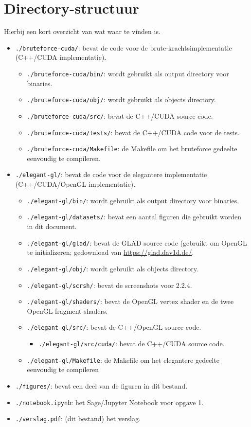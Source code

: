 \documentclass{article}
\begin{document}
\section{Directory-structuur}
Hierbij een kort overzicht van wat waar te vinden is.
\begin{itemize}
 \item \verb|./bruteforce-cuda/|: bevat de code voor de brute-krachtsimplementatie (C++/CUDA implementatie).
 \begin{itemize}
  \item \verb|./bruteforce-cuda/bin/|: wordt gebruikt als output directory voor binaries.
  \item \verb|./bruteforce-cuda/obj/|: wordt gebruikt als objects directory.
  \item \verb|./bruteforce-cuda/src/|: bevat de C++/CUDA source code.
  \item \verb|./bruteforce-cuda/tests/|: bevat de C++/CUDA code voor de tests.
  \item \verb|./bruteforce-cuda/Makefile|: de Makefile om het bruteforce gedeelte eenvoudig te compileren.
 \end{itemize}
 \item \verb|./elegant-gl/|: bevat de code voor de elegantere implementatie (C++/CUDA/OpenGL implementatie).
 \begin{itemize}
  \item \verb|./elegant-gl/bin/|: wordt gebruikt als output directory voor binaries.
  \item \verb|./elegant-gl/datasets/|: bevat een aantal figuren die gebruikt worden in dit document.
  \item \verb|./elegant-gl/glad/|: bevat de GLAD source code (gebruikt om OpenGL te initializeren; gedownload van \href{https://glad.dav1d.de/}{https://glad.dav1d.de/}.
  \item \verb|./elegant-gl/obj/|: wordt gebruikt als objects directory.
  \item \verb|./elegant-gl/scrsh/|: bevat de screenshots voor 2.2.4.
  \item \verb|./elegant-gl/shaders/|: bevat de OpenGL vertex shader en de twee OpenGL fragment shaders.
  \item \verb|./elegant-gl/src/|: bevat de C++/OpenGL source code.
  \begin{itemize}
   \item \verb|./elegant-gl/src/cuda/|: bevat de C++/CUDA source code.
  \end{itemize}
  \item \verb|./elegant-gl/Makefile|: de Makefile om het elegantere gedeelte eenvoudig te compileren
 \end{itemize}
 \item \verb|./figures/|: bevat een deel van de figuren in dit bestand.
 \item \verb|./notebook.ipynb|: het Sage/Jupyter Notebook voor opgave 1.
 \item \verb|./verslag.pdf|: (dit bestand) het verslag.
\end{itemize}
\end{document}
